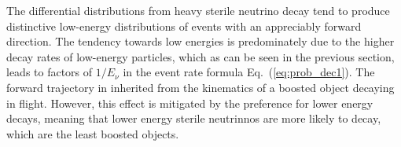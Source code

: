 \documentclass[11pt, a4paper]{article}
\newcommand{\refeq}[1]{Eq.~(\ref{#1})}
\def\muboone{MicroBooNE}
\def\ster{\ensuremath N}
\begin{document}
% 
%
%

The differential distributions from heavy sterile neutrino decay tend to produce
distinctive low-energy distributions of events with an appreciably forward
direction. 
%
The tendency towards low energies is predominately due to the higher decay
rates of low-energy particles, which as can be seen in the previous section,
leads to factors of $1/E_\nu$ in the event rate formula \refeq{eq:prob_dec1}.
%
The forward trajectory in inherited from the kinematics of a boosted object
decaying in flight. However, this effect is mitigated by the preference for
lower energy decays, meaning that lower energy sterile neutrinnos are more likely to
decay, which are the least boosted objects.
\end{document}

